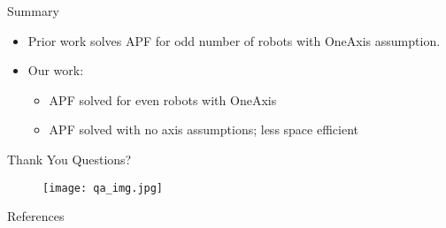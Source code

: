 \documentclass{beamer}
\begin{document}
\begin{frame}{Summary}
	\begin{itemize}
		\item Prior work solves APF for odd number of robots with OneAxis assumption.
		\pause
		\item Our work:
			\begin{itemize}
				\item APF solved for even robots with OneAxis
				\item APF solved with no axis assumptions; less space efficient
			\end{itemize}
	\end{itemize}
\end{frame}

\begin{frame}{Thank You}
Questions?
\begin{figure}[ht!]
\centering
\texttt{[image: qa\_img.jpg]}
\end{figure}
\end{frame}

\begin{frame}{References}
 

\end{frame}
\end{document}
